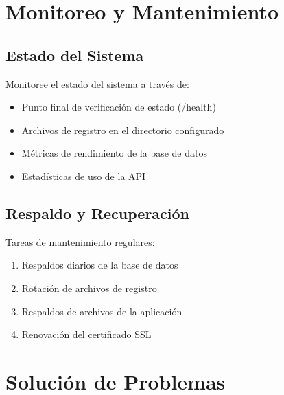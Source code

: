 \section{Monitoreo y Mantenimiento}

\subsection{Estado del Sistema}
Monitoree el estado del sistema a través de:
\begin{itemize}
    \item Punto final de verificación de estado (/health)
    \item Archivos de registro en el directorio configurado
    \item Métricas de rendimiento de la base de datos
    \item Estadísticas de uso de la API
\end{itemize}

\subsection{Respaldo y Recuperación}
Tareas de mantenimiento regulares:
\begin{enumerate}
    \item Respaldos diarios de la base de datos
    \item Rotación de archivos de registro
    \item Respaldos de archivos de la aplicación
    \item Renovación del certificado SSL
\end{enumerate}

\section{Solución de Problemas}

